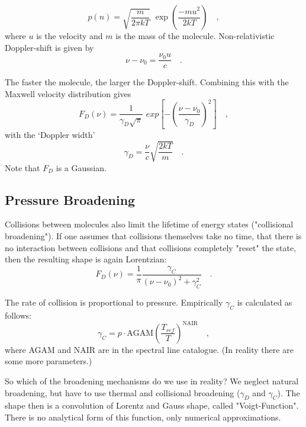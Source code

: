\begin{equation}
p(n) = \sqrt{\frac{m}{2\pi kT}} \,\, \exp \left(\frac{-mu^{2}}{2kT}
\right)  \quad ,
\end{equation}
where $u$ is the velocity and $m$ is the mass of the molecule. 
Non-relativistic Doppler-shift is given by
\begin{equation}
\nu - \nu_{0} = \frac{\nu_{0}u}{c} \quad .
\end{equation}

The faster the molecule, the larger the Doppler-shift. Combining this
with the Maxwell velocity distribution gives
\begin{equation}
F_{D}(\nu) = \frac{1}{\gamma_{D}\sqrt{\pi}} \,\, exp \left[- \left( \frac{\nu
    - \nu_{0}}{\gamma_{D}} \right )^{2} \right] \quad ,
\end{equation}
with the `Doppler width'
\begin{equation}
  \gamma_{D} = \frac{\nu}{c} \sqrt{\frac{2kT}{m}} \quad .
\end{equation}
Note that $F_{D}$ is a Gaussian.  

\subsection{Pressure Broadening}

Collisions between molecules also limit the lifetime of energy states
("collisional broadening"). If one assumes that collisions themselves
take no time, that there is no interaction between collisions and that
collisions completely "reset" the state, then the resulting shape is
again Lorentzian:
\begin{equation}
F_{D}(\nu) = \frac{1}{\pi} \frac{\gamma_{C}}{(\nu - \nu_{0})^{2} +
  \gamma_{C}^{2}} \quad .
\end{equation}

The rate of collision is proportional to pressure. Empirically $\gamma_{C}$ is calculated as follows:
\begin{equation}
\gamma_{C} = p \cdot \mathrm{AGAM} \left( \frac{T_{ref}}{T} \right)^{\mathrm{NAIR}} \quad ,
\end{equation}
where AGAM and NAIR are in the spectral line catalogue. (In reality there are some more parameters.) 

So which of the broadening mechanisms do we use in reality? We neglect
natural broadening, but have to use thermal and collisional broadening
($\gamma_{D}$ and $\gamma_{C}$). The shape then is a convolution of
Lorentz and Gauss shape, called "Voigt-Function". There is no
analytical form of this function, only numerical approximations.

